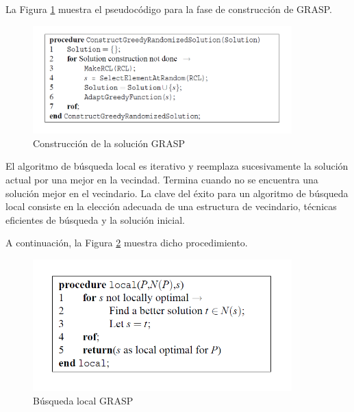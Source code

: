 \documentclass[a4paper,12pt]{book}
\begin{document}
		La Figura \ref{GRASPconstructionphase} muestra el pseudocódigo para la fase de construcción de GRASP.
	
		\begin{figure}[h]
			\centering
			\includegraphics[width=10cm]{./Graphics/GRASPconstructionphase.png}
			\caption{Construcción de la solución GRASP}
			\label{GRASPconstructionphase}
		\end{figure}
	
		El algoritmo de búsqueda local es iterativo y reemplaza sucesivamente la solución actual por una mejor en la vecindad. Termina cuando no se encuentra una solución mejor en el vecindario. La clave del éxito para un algoritmo de búsqueda local consiste en la elección adecuada de una estructura de vecindario, técnicas eficientes de búsqueda y la solución inicial.
		
		A continuación, la Figura \ref{GRASPlocal} muestra dicho procedimiento.
		
		\begin{figure}[h]
			\centering
			\includegraphics[width=10cm]{./Graphics/GRASPlocal.png}
			\caption{Búsqueda local GRASP}
			\label{GRASPlocal}
		\end{figure}
		



\end{document}
